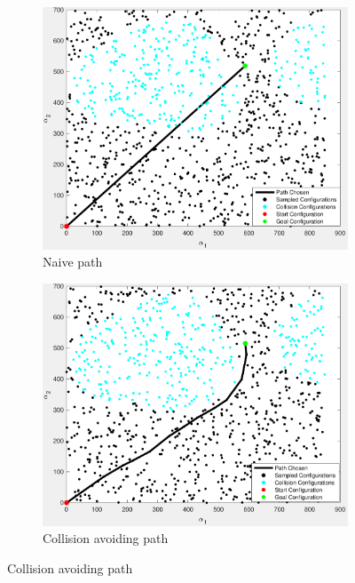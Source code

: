 \documentclass[letterpaper, 10 pt, conference]{ieeeconf}  %
\begin{document}
 \begin{figure}[htpb]
        \centering
        \begin{subfigure}[b]{1.4in} 
                \centering
                \includegraphics[width=\textwidth]{figures/path/path1.pdf}
                \caption{Naive path}
                \label{fig:path1}
        \end{subfigure}
        \begin{subfigure}[b]{1.4in}                            
                \centering
                \includegraphics[width=\textwidth]{figures/path/path2.pdf}
                \caption{Collision avoiding path}
                \label{fig:path2}
        \end{subfigure}
        

\end{figure}
\end{document}
